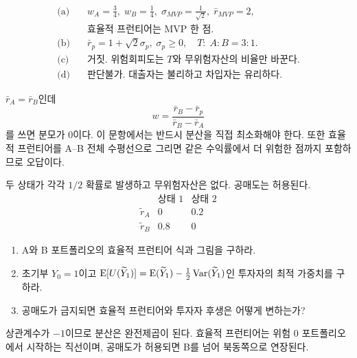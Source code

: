 \begin{answerbox}
\begin{align*}
\text{(a)}\quad &w_A=\frac34,\;w_B=\frac14,\;\sigma_{MVP}=\frac1{\sqrt2},\;\bar r_{MVP}=2,\\
&\text{효율적 프런티어는 MVP 한 점.}\\
\text{(b)}\quad &\bar r_p=1+\sqrt2\sigma_p,\;\sigma_p\ge0,\quad T:\;A:B=3:1.\\
\text{(c)}\quad &\text{거짓. 위험회피도는 $T$와 무위험자산의 비율만 바꾼다.}\\
\text{(d)}\quad &\text{판단불가. 대출자는 불리하고 차입자는 유리하다.}
\end{align*}
\end{answerbox}

\begin{warningbox}
$\bar r_A=\bar r_B$인데
\[
w=\frac{\bar r_B-\bar r_p}{\bar r_B-\bar r_A}
\]
를 쓰면 분모가 0이다. 이 문항에서는 반드시 분산을 직접 최소화해야 한다. 또한 효율적 프런티어를 A--B 전체 수평선으로 그리면 같은 수익률에서 더 위험한 점까지 포함하므로 오답이다.
\end{warningbox}

\begin{officialbox}
두 상태가 각각 $1/2$ 확률로 발생하고 무위험자산은 없다. 공매도는 허용된다.
\[
\begin{array}{c|cc}
&\text{상태 1}&\text{상태 2}\\\hline
\widetilde r_A&0&0.2\\
\widetilde r_B&0.8&0
\end{array}
\]
\begin{enumerate}[label=(\alph*)]
\item A와 B 포트폴리오의 효율적 프런티어 식과 그림을 구하라.
\item 초기부 $Y_0=1$이고 $\operatorname{E}[U(\widetilde Y_1)]=\operatorname{E}(\widetilde Y_1)-\frac12\operatorname{Var}(\widetilde Y_1)$인 투자자의 최적 가중치를 구하라.
\item 공매도가 금지되면 효율적 프런티어와 투자자 후생은 어떻게 변하는가?
\end{enumerate}
\end{officialbox}

\begin{strategybox}
상관계수가 $-1$이므로 분산은 완전제곱이 된다. 효율적 프런티어는 위험 0 포트폴리오에서 시작하는 직선이며, 공매도가 허용되면 B를 넘어 북동쪽으로 연장된다.
\end{strategybox}

